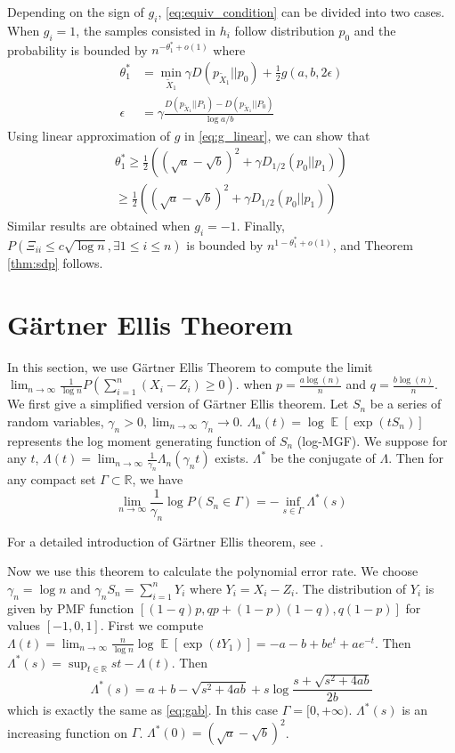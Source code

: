 \documentclass{article}
\DeclareMathOperator{\E}{\mathbb{E}}
\newcommand{\A}{\frac{a \log(n)}{n}}
\newcommand{\B}{\frac{b \log(n)}{n}}
\begin{document}
Depending on the sign of $g_i$, \eqref{eq:equiv_condition} can be divided into two cases. When $g_i=1$, the samples consisted in $h_i$
follow distribution $p_0$ and the probability is bounded by $n^{-\theta^*_1 + o(1)}$ where
\begin{align}
\theta^*_1 &= \min_{\widetilde{X}_1} \gamma D(p_{\widetilde{X}_1}|| p_0)+ \frac{1}{2} g(a,b, 2\epsilon) \label{eq:theta_star2} \\
\epsilon &= \gamma \frac{D(p_{\widetilde{X}_1} || P_1) - D(p_{\widetilde{X}_1} || P_0) }{\log a /b}
\end{align}
Using linear approximation of $g$ in \eqref{eq:g_linear}, we can show that 
\begin{align*}
\theta^*_1 \geq \frac{1}{2}((\sqrt{a}-\sqrt{b})^2+\gamma D_{1/2}(p_0||p_1)) \\
\geq \frac{1}{2}((\sqrt{a}-\sqrt{b})^2+\gamma D_{1/2}(p_0||p_1))
\end{align*}
Similar results are obtained when $g_i=-1$. Finally,
$P(\Xi_{ii} \leq c\sqrt{\log n}, \exists 1\leq i \leq n)$ is bounded by $n^{1-\theta_1^*+o(1)}$, and Theorem \ref{thm:sdp} follows.
\section{Gärtner Ellis Theorem}
In this section, we use Gärtner Ellis Theorem to compute the limit\linebreak
$\lim_{n\to \infty} \frac{1}{\log n} P(\sum_{i=1}^n (X_i - Z_i)  \geq 0)$.
when $p=\A$ and $q=\B$.
We first give a simplified version of Gärtner Ellis theorem.
Let $S_n$ be a series of random variables, $\gamma_n >0, \lim_{n\to \infty}\gamma_n \to 0$.
$\Lambda_n(t)=\log \E[\exp(t S_n)]$ represents the log moment generating function of $S_n$ (log-MGF).
We suppose for any $t$, $\Lambda(t) =\lim_{n\to \infty} \frac{1}{\gamma_n}\Lambda_n(\gamma_n t)$
exists. $\Lambda^*$ be the conjugate of $\Lambda$.
Then for any compact set $\Gamma \subset \mathbb{R}$,
we have
\begin{equation}
\lim_{n\to \infty} \frac{1}{\gamma_n}\log P(S_n \in \Gamma) = -\inf_{s \in \Gamma} \Lambda^*(s)
\end{equation}

For a detailed introduction of Gärtner Ellis theorem, see \cite{div}.

Now we use this theorem to calculate the polynomial error rate.
We choose $\gamma_n= \log n$ and $\gamma_n S_n = \sum_{i=1}^n Y_i$ where $Y_i=X_i - Z_i$.
The distribution of $Y_i$ is given by PMF function $[(1-q)p, qp+(1-p)(1-q), q(1-p)]$ for values $[-1,0,1]$. First we compute
$\Lambda(t) = \lim_{n\to \infty} \frac{n}{\log n} \log \E[\exp(t Y_1)]
=-a-b+be^t  + ae^{-t}$. Then $\Lambda^*(s) = \sup_{t\in\mathbb{R}} st - \Lambda(t)$.
Then
\begin{equation}
\Lambda^*(s) = a+b - \sqrt{s^2 + 4ab} + s\log \frac{s+ \sqrt{s^2 + 4ab}}{2b}
\end{equation}
which is exactly the same as \eqref{eq:gab}.
In this case $\Gamma=[0, +\infty)$. $\Lambda^*(s)$ is an increasing function on $\Gamma$.
$\Lambda^*(0)= (\sqrt{a} - \sqrt{b})^2$.
\end{document}
